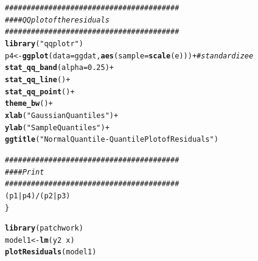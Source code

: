 \documentclass{article}\usepackage[]{graphicx}\usepackage[]{color}
\makeatletter
\newcommand{\hlnum}[1]{\textcolor[rgb]{0.686,0.059,0.569}{#1}}%
\newcommand{\hlstr}[1]{\textcolor[rgb]{0.192,0.494,0.8}{#1}}%
\newcommand{\hlcom}[1]{\textcolor[rgb]{0.678,0.584,0.686}{\textit{#1}}}%
\newcommand{\hlopt}[1]{\textcolor[rgb]{0,0,0}{#1}}%
\newcommand{\hlstd}[1]{\textcolor[rgb]{0.345,0.345,0.345}{#1}}%
\newcommand{\hlkwb}[1]{\textcolor[rgb]{0.69,0.353,0.396}{#1}}%
\newcommand{\hlkwc}[1]{\textcolor[rgb]{0.333,0.667,0.333}{#1}}%
\newcommand{\hlkwd}[1]{\textcolor[rgb]{0.737,0.353,0.396}{\textbf{#1}}}%
\newenvironment{kframe}{%
 \def\at@end@of@kframe{}%
 \ifinner\ifhmode%
  \def\at@end@of@kframe{\end{minipage}}%
  \begin{minipage}{\columnwidth}%
 \fi\fi%
 \def\FrameCommand##1{\hskip\@totalleftmargin \hskip-\fboxsep
 \colorbox{shadecolor}{##1}\hskip-\fboxsep
     \hskip-\linewidth \hskip-\@totalleftmargin \hskip\columnwidth}%
 \MakeFramed {\advance\hsize-\width
   \@totalleftmargin\z@ \linewidth\hsize
   \@setminipage}}%
 {\par\unskip\endMakeFramed%
 \at@end@of@kframe}
\newenvironment{knitrout}{}{} %
\makeatother
\begin{document}
\begin{enumerate}
\begin{enumerate}
\begin{knitrout}
\begin{kframe}
\begin{alltt}
  \hlcom{########################################}
  \hlcom{####  QQplot of the residuals}
  \hlcom{########################################}
  \hlkwd{library}\hlstd{(}\hlstr{"qqplotr"}\hlstd{)}
  \hlstd{p4}\hlkwb{<-}\hlkwd{ggplot}\hlstd{(}\hlkwc{data}\hlstd{=ggdat,}\hlkwd{aes}\hlstd{(}\hlkwc{sample}\hlstd{=}\hlkwd{scale}\hlstd{(e)))}\hlopt{+} \hlcom{#standardize e}
    \hlkwd{stat_qq_band}\hlstd{(}\hlkwc{alpha}\hlstd{=}\hlnum{0.25}\hlstd{)} \hlopt{+}
    \hlkwd{stat_qq_line}\hlstd{()} \hlopt{+}
    \hlkwd{stat_qq_point}\hlstd{()} \hlopt{+}
    \hlkwd{theme_bw}\hlstd{()}\hlopt{+}
    \hlkwd{xlab}\hlstd{(}\hlstr{"Gaussian Quantiles"}\hlstd{)}\hlopt{+}
    \hlkwd{ylab}\hlstd{(}\hlstr{"Sample Quantiles"}\hlstd{)}\hlopt{+}
    \hlkwd{ggtitle}\hlstd{(}\hlstr{"Normal Quantile-Quantile Plot of Residuals"}\hlstd{)}


  \hlcom{########################################}
  \hlcom{####  Print}
  \hlcom{########################################}
  \hlstd{(p1}\hlopt{|}\hlstd{p4)}\hlopt{/}\hlstd{(p2}\hlopt{|}\hlstd{p3)}
\hlstd{\}}
\end{alltt}
\end{kframe}
\end{knitrout}

\begin{knitrout}
\color{fgcolor}\begin{kframe}
\begin{alltt}
\hlkwd{library}\hlstd{(patchwork)}
\hlstd{model1} \hlkwb{<-} \hlkwd{lm}\hlstd{(y2}\hlopt{~}\hlstd{x)}
\hlkwd{plotResiduals}\hlstd{(model1)}
\end{alltt}


{\ttfamily\noindent\itshape\color{messagecolor}{\#\# \\\#\# Attaching package: 'qqplotr'}}


\end{kframe}
\end{knitrout}
\end{enumerate}
\end{enumerate}
\end{document}
